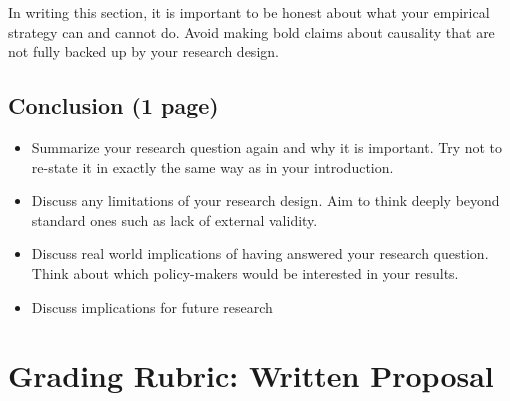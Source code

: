 \documentclass[
]{article}
\begin{document}
In writing this section, it is important to be honest about what your empirical strategy can and cannot do. Avoid making bold claims about causality that are not fully backed up by your research design.

\hypertarget{conclusion-1-page}{%
\subsection{Conclusion (1 page)}\label{conclusion-1-page}}

\begin{itemize}
\item
  Summarize your research question again and why it is important. Try not to re-state it in exactly the same way as in your introduction.
\item
  Discuss any limitations of your research design. Aim to think deeply beyond standard ones such as lack of external validity.
\item
  Discuss real world implications of having answered your research question. Think about which policy-makers would be interested in your results.
\item
  Discuss implications for future research
\end{itemize}

\clearpage

\hypertarget{grading-rubric-written-proposal}{%
\section{Grading Rubric: Written Proposal}\label{grading-rubric-written-proposal}}
\end{document}
